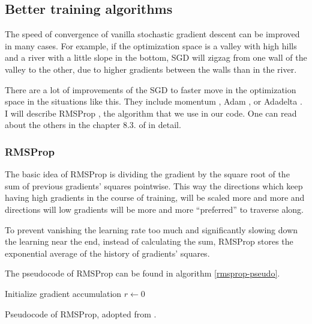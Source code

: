 \subsection{Better training algorithms}
The speed of convergence of vanilla stochastic gradient descent can be improved in many cases. For example, if the optimization space is a valley with high hills and a river with a little slope in the bottom, SGD will zigzag from one wall of the valley to the other, due to higher gradients between the walls than in the river.

There are a lot of improvements of the SGD to faster move in the optimization space in the situations like this. They include momentum \cite{momentum}, Adam \cite{adam}, or Adadelta \cite{adadelta}. I will describe RMSProp \cite{rmsprop}, the algorithm that we use in our code. One can read about the others in the chapter 8.3. of \cite{dlbook} in detail.

\subsubsection{RMSProp}\label{rmsprop-section}
The basic idea of RMSProp is dividing the gradient by the square root of the sum of previous gradients' squares pointwise. This way the directions which keep having high gradients in the course of training, will be scaled more and more and directions will low gradients will be more and more ``preferred'' to traverse along.

To prevent vanishing the learning rate too much and significantly slowing down the learning near the end, instead of calculating the sum, RMSProp stores the exponential average of the history of gradients' squares.

The pseudocode of RMSProp can be found in algorithm \ref{rmsprop-pseudo}.
\begin{algorithm}
  \DontPrintSemicolon
  Initialize gradient accumulation $r \leftarrow 0$\;
  \caption{Pseudocode of RMSProp, adopted from \cite{dlbook}.}\label{rmsprop-pseudo}
\end{algorithm}

